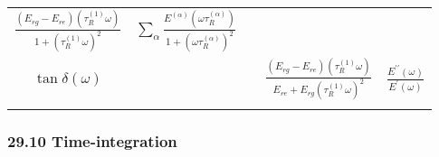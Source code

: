 \begin{longtable}[]{@{}ccccc@{}}
\begin{minipage}[t]{0.29\columnwidth}
\(\frac{\left(E_{r g}-E_{r e}\right)\left(\tau_{R}^{(1)} \omega\right)}{1+\left(\tau_{R}^{(1)} \omega\right)^{2}}\)\strut
\end{minipage} & \begin{minipage}[t]{0.30\columnwidth}\centering
\(\sum_{\alpha} \frac{E^{(\alpha)}\left(\omega \tau_{R}^{(\alpha)}\right)}{1+\left(\omega \tau_{R}^{(\alpha)}\right)^{2}}\)\strut
\end{minipage}\tabularnewline
\begin{minipage}[t]{0.07\columnwidth}\centering
\(\tan \delta(\omega)\)\strut
\end{minipage} & \begin{minipage}[t]{0.08\columnwidth}\centering
\strut
\end{minipage} & \begin{minipage}[t]{0.12\columnwidth}\centering
\strut
\end{minipage} & \begin{minipage}[t]{0.29\columnwidth}\centering
\(\frac{\left(E_{r g}-E_{r e}\right)\left(\tau_{R}^{(1)} \omega\right)}{E_{r e}+E_{r g}\left(\tau_{R}^{(1)} \omega\right)^{2}}\)\strut
\end{minipage} & \begin{minipage}[t]{0.30\columnwidth}\centering
\(\frac{E^{\prime \prime}(\omega)}{E^{\prime}(\omega)}\)\strut
\end{minipage}\tabularnewline
\begin{minipage}[t]{0.07\columnwidth}\centering
\strut
\end{minipage} & \begin{minipage}[t]{0.08\columnwidth}\centering
\strut
\end{minipage} & \begin{minipage}[t]{0.12\columnwidth}\centering
\strut
\end{minipage} & \begin{minipage}[t]{0.29\columnwidth}\centering
\strut
\end{minipage} & \begin{minipage}[t]{0.30\columnwidth}\centering
\strut
\end{minipage}\tabularnewline
\bottomrule
\end{longtable}

\hypertarget{time-integration}{%
\subsubsection{29.10 Time-integration}\label{time-integration}}

